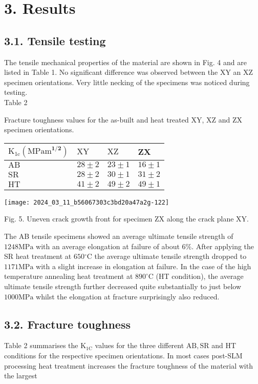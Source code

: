 \documentclass[10pt]{article}
\begin{document}
\section*{3. Results}
\subsection*{3.1. Tensile testing}
The tensile mechanical properties of the material are shown in Fig. 4 and are listed in Table 1. No significant difference was observed between the XY an XZ specimen orientations. Very little necking of the specimens was noticed during testing.\\
Table 2

Fracture toughness values for the as-built and heat treated XY, XZ and ZX specimen orientations.

\begin{center}
\begin{tabular}{llll}
\hline
$\mathrm{K}_{1 \mathrm{c}}\left(\mathrm{MPam}^{\mathbf{1} / \mathbf{2}}\right)$ & $\mathrm{XY}$ & $\mathrm{XZ}$ & ZX \\
\hline
$\mathrm{AB}$ & $28 \pm 2$ & $23 \pm 1$ & $16 \pm 1$ \\
$\mathrm{SR}$ & $28 \pm 2$ & $30 \pm 1$ & $31 \pm 2$ \\
$\mathrm{HT}$ & $41 \pm 2$ & $49 \pm 2$ & $49 \pm 1$ \\
\hline
\end{tabular}
\end{center}

\begin{center}
\texttt{[image: 2024\_03\_11\_b56067303c3bd20a47a2g-122]}
\end{center}

Fig. 5. Uneven crack growth front for specimen ZX along the crack plane XY.

The AB tensile specimens showed an average ultimate tensile strength of $1248 \mathrm{MPa}$ with an average elongation at failure of about $6 \%$. After applying the SR heat treatment at $650{ }^{\circ} \mathrm{C}$ the average ultimate tensile strength dropped to $1171 \mathrm{MPa}$ with a slight increase in elongation at failure. In the case of the high temperature annealing heat treatment at $890^{\circ} \mathrm{C}$ (HT condition), the average ultimate tensile strength further decreased quite substantially to just below $1000 \mathrm{MPa}$ whilst the elongation at fracture surprisingly also reduced.

\subsection*{3.2. Fracture toughness}
Table 2 summarises the $\mathrm{K}_{1 \mathrm{C}}$ values for the three different $\mathrm{AB}, \mathrm{SR}$ and HT conditions for the respective specimen orientations. In most cases post-SLM processing heat treatment increases the fracture toughness of the material with the largest
\end{document}
